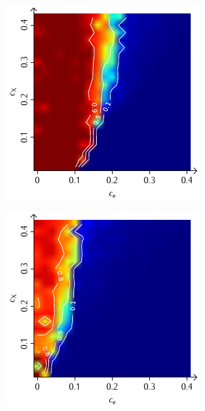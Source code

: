 \documentclass[a4paper, 10pt, twoside, openany]{book} %
\begin{document}
\begin{figure}
\begin{minipage}[t]{0.48\textwidth}
        \label{H_penalty_random_G}
    \end{minipage}
    \begin{minipage}[t]{0.48\textwidth}
        \includegraphics[width=\textwidth]{Abbildungen/Phasendiagramme/Konturen/H_individual_G.pdf}
        \label{H_individual_G}
    \end{minipage}
    \hfill
    \begin{minipage}[t]{0.48\textwidth}
        \includegraphics[width=\textwidth]{Abbildungen/Phasendiagramme/Konturen/H_penalty_individual_G.pdf}

\end{minipage}
\end{figure}
\end{document}
